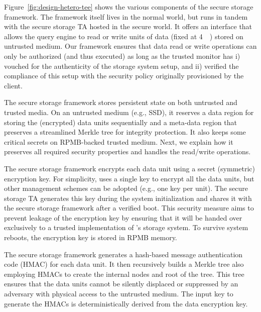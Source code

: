 Figure~\ref{fig:design-hetero-tee} shows the various components of the secure storage framework. The framework itself lives in the normal world, but runs in tandem with the secure storage TA hosted in the secure world. It offers an interface that allows the query engine to read or write units of data (fixed at \SI{4}{\kibi\byte}) stored on untrusted medium. Our framework ensures that data read or write operations can only be authorized (and thus executed) as long as the trusted monitor has i) vouched for the authenticity of the storage system setup, and ii) verified the compliance of this setup with the security policy originally provisioned by the client. 

The secure storage framework stores persistent state on both untrusted and trusted media. On an untrusted medium (e.g., SSD), it reserves a data region for storing the (encrypted) data units sequentially and a meta-data region that preserves a streamlined Merkle tree for integrity protection. It also keeps some critical secrets on RPMB-backed trusted medium. Next, we explain how it preserves all required security properties and handles the read/write operations.

 The secure storage framework encrypts each data unit using a secret (symmetric) encryption key. For simplicity, \project uses a single key to encrypt all the data units, but other management schemes can be adopted (e.g., one key per unit). The secure storage TA generates this key during the system initialization and shares it with the secure storage framework after a verified boot. This security measure aims to prevent leakage of the encryption key by ensuring that it will be handed over exclusively to a trusted implementation of \project's storage system. To survive system reboots, the encryption key is stored in RPMB memory.

 The secure storage framework generates a hash-based message authentication code (HMAC) for each data unit. It then recursively builds a Merkle tree also employing HMACs to create the internal nodes and root of the tree. This tree ensures that the data units cannot be silently displaced or suppressed by an adversary with physical access to the untrusted medium. The input key to generate the HMACs is deterministically derived from the data encryption key.

